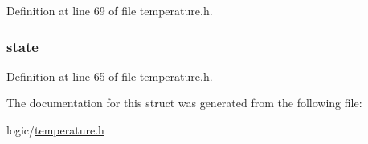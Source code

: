 \-Definition at line 69 of file temperature.\-h.

\hypertarget{structtemp_ac6b2518df4ca45cee089e61f152572b2}{
\subsubsection[{state}]{ {\bf state}}}\label{structtemp_ac6b2518df4ca45cee089e61f152572b2}


\-Definition at line 65 of file temperature.\-h.



\-The documentation for this struct was generated from the following file\-:\begin{DoxyCompactItemize}
\item 
logic/\hyperlink{temperature_8h}{temperature.\-h}\end{DoxyCompactItemize}
